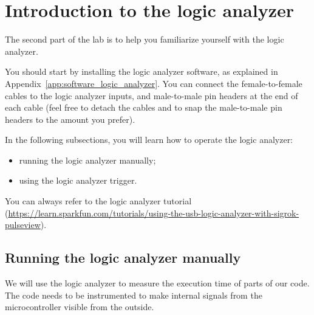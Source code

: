 
\section{Introduction to the logic analyzer}

The second part of the lab is to help you familiarize yourself with the logic analyzer. 

You should start by installing the logic analyzer software, as explained in Appendix~\ref{app:software_logic_analyzer}. You can connect the female-to-female cables to the logic analyzer inputs, and male-to-male pin headers at the end of each cable (feel free to detach the cables and to snap the male-to-male pin headers to the amount you prefer). 

In the following subsections, you will learn how to operate the logic analyzer: 
\begin{itemize}
	\item running the logic analyzer manually; 
	\item using the logic analyzer trigger. 
\end{itemize}
You can always refer to the logic analyzer tutorial (\url{https://learn.sparkfun.com/tutorials/using-the-usb-logic-analyzer-with-sigrok-pulseview}). 




\subsection{Running the logic analyzer manually}

We will use the logic analyzer to measure the execution time of parts of our code. The code needs to be instrumented to make internal signals from the microcontroller visible from the outside. 

{}

